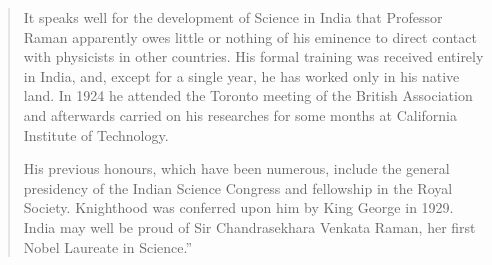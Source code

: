 \begin{quote}
{It speaks well for the development of Science in India that Professor Raman apparently owes little or nothing of his
 eminence to direct contact with physicists in other countries. His formal training was received entirely in India, and, except for a single year, he has worked only in his native land. In 1924 he attended the Toronto meeting of the British Association and afterwards carried on his researches for some months at California Institute of Technology.}\relax

{\fontsize{10pt}{11.85pt}\selectfont His previous honours, which have been numerous, include the general presidency of the Indian Science Congress and fellowship in the Royal Society. Knighthood was conferred upon him by King George in 1929. India may well be proud of Sir Chandrasekhara Venkata \hbox{Raman}, her first Nobel Laureate in Science.''}\relax{}
\end{quote}





